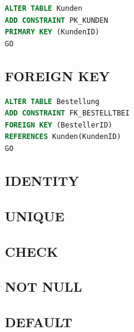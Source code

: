 \documentclass[12pt,ngerman,a4paper,index=totoc,twoside]{scrartcl}
\newcommand{\sql}[1]{\texttt{#1}}
\newcommand{\lwidth}{0.75}
\begin{document}
\begin{center}
\begin{minipage}{\lwidth\textwidth}
\begin{lstlisting}[language={SQL},caption={\sql{ALTER TABLE} Abfrage um einen \sql{PRIMARY KEY} anzulegen},label={create3:alter1}]
ALTER TABLE Kunden
ADD CONSTRAINT PK_KUNDEN
PRIMARY KEY (KundenID)
GO
\end{lstlisting}
\end{minipage}
\end{center}  


\subsection{FOREIGN KEY}  

\begin{center}
\begin{minipage}{\lwidth\textwidth}
\begin{lstlisting}[language={SQL},caption={\sql{ALTER TABLE} Abfrage, um einen \sql{FOREIGN KEY} anzulegen}, label={create3:alter2}]
ALTER TABLE Bestellung
ADD CONSTRAINT FK_BESTELLTBEI
FOREIGN KEY (BestellerID)
REFERENCES Kunden(KundenID)
GO
\end{lstlisting}
\end{minipage}
\end{center}

\subsection{IDENTITY}  

\subsection{UNIQUE}  

\subsection{CHECK}  

\subsection{NOT NULL}   

\subsection{DEFAULT}   
\end{document}
